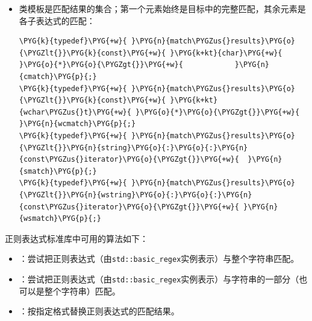 \begin{itemize}

\item 类模板是匹配结果的集合；第一个元素始终是目标中的完整匹配，其余元素是各子表达式的匹配：



\begin{codeblockbg}
\begin{Verbatim}[commandchars=\\\{\},breaklines=true,breakanywhere=true,fontsize=\codefont,xleftmargin=17bp]
\PYG{k}{typedef}\PYG{+w}{ }\PYG{n}{match\PYGZus{}results}\PYG{o}{\PYGZlt{}}\PYG{k}{const}\PYG{+w}{ }\PYG{k+kt}{char}\PYG{+w}{ }\PYG{o}{*}\PYG{o}{\PYGZgt{}}\PYG{+w}{            }\PYG{n}{cmatch}\PYG{p}{;}
\PYG{k}{typedef}\PYG{+w}{ }\PYG{n}{match\PYGZus{}results}\PYG{o}{\PYGZlt{}}\PYG{k}{const}\PYG{+w}{ }\PYG{k+kt}{wchar\PYGZus{}t}\PYG{+w}{ }\PYG{o}{*}\PYG{o}{\PYGZgt{}}\PYG{+w}{         }\PYG{n}{wcmatch}\PYG{p}{;}
\PYG{k}{typedef}\PYG{+w}{ }\PYG{n}{match\PYGZus{}results}\PYG{o}{\PYGZlt{}}\PYG{n}{string}\PYG{o}{:}\PYG{o}{:}\PYG{n}{const\PYGZus{}iterator}\PYG{o}{\PYGZgt{}}\PYG{+w}{  }\PYG{n}{smatch}\PYG{p}{;}
\PYG{k}{typedef}\PYG{+w}{ }\PYG{n}{match\PYGZus{}results}\PYG{o}{\PYGZlt{}}\PYG{n}{wstring}\PYG{o}{:}\PYG{o}{:}\PYG{n}{const\PYGZus{}iterator}\PYG{o}{\PYGZgt{}}\PYG{+w}{ }\PYG{n}{wsmatch}\PYG{p}{;}
\end{Verbatim}
\end{codeblockbg}

\end{itemize}



正则表达式标准库中可用的算法如下：



\begin{itemize}
\item {}：尝试把正则表达式（由\texttt{std::\allowbreak{}basic\_\allowbreak{}regex}实例表示）与整个字符串匹配。



\item {}：尝试把正则表达式（由\texttt{std::\allowbreak{}basic\_\allowbreak{}regex}实例表示）与字符串的一部分（也可以是整个字符串）匹配。



\item {}：按指定格式替换正则表达式的匹配结果。

\end{itemize}


